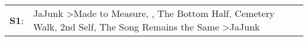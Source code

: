 \begin{supertabular}{p{0.03\textwidth}p{0.92\textwidth}}
 \textbf{S1}:  &  JaJunk\textsuperscript{} \textgreater \enspace Made to Measure\textsuperscript{}, \textsuperscript{}, \enspace The Bottom Half\textsuperscript{}, \enspace Cemetery Walk\textsuperscript{}, \enspace 2nd Self\textsuperscript{}, \enspace The Song Remains the Same\textsuperscript{} \textgreater \enspace JaJunk\textsuperscript{}  \enspace  \\
\end{supertabular}
